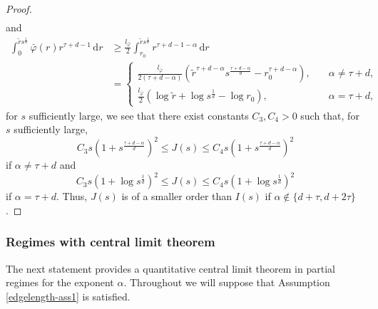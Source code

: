 \documentclass{article}
\theoremstyle{definition}
\numberwithin{equation}{section}
\theoremstyle{remark}
\begin{document}
\begin{proof}
\begin{align}
\end{align}
and
\begin{align*}
\int_{0}^{\tilde{r} s^{\frac{1}{d}}} \bar{\varphi}(r) r^{\tau+d-1} \, \mathrm{d}r & \geq \frac{l_{\bar{\varphi}}}{2} \int_{r_0}^{\tilde{r} s^{\frac{1}{d}}} r^{\tau+d-1-\alpha} \, \mathrm{d}r \\
& = \begin{cases}  \frac{l_{\bar{\varphi}}}{2(\tau+d-\alpha)} (\tilde{r}^{\tau+d-\alpha} s^{\frac{\tau+d-\alpha}{d}}-r_0^{\tau+d-\alpha}), & \quad \alpha\neq \tau+d, \\ \frac{l_{\bar{\varphi}}}{2} ( \log \tilde{r} + \log s^{\frac{1}{d}} - \log r_0), & \quad \alpha= \tau+d,  \end{cases}
\end{align*}
for $s$ sufficiently large, we see that there exist constants $C_3,C_4>0$ such that, for $s$ sufficiently large,
$$
C_3 s (1+s^{\frac{\tau+d-\alpha}{d}})^2 \leq J(s) \leq C_4 s (1+s^{\frac{\tau+d-\alpha}{d}})^2
$$
if $\alpha\neq \tau+d$ and
$$
C_3 s (1+\log s^{\frac{1}{d}})^2 \leq J(s) \leq C_4 s (1+\log s^{\frac{1}{d}})^2
$$
if $\alpha = \tau+d$. Thus, $J(s)$ is of a smaller order than $I(s)$ if $\alpha\notin\{d+\tau,d+2\tau\}$.

\end{proof}

\subsubsection{Regimes with central limit theorem} \label{regimeclt}

The next statement provides a quantitative central limit theorem in partial regimes for the exponent $\alpha$. Throughout we will suppose that Assumption \ref{edgelength-ass1} is satisfied.
\end{document}
